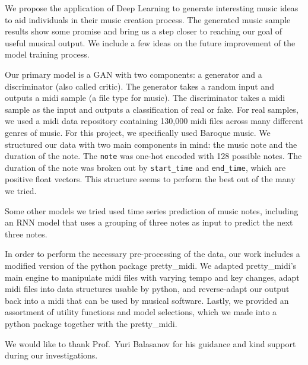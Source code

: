 \documentclass[12pt,oneside]{chicagocapstone}
\begin{document}
  \begin{executive}
    We propose the application of Deep Learning to generate interesting music ideas to aid individuals in their music creation process. The generated music sample results show some promise and bring us a step closer to reaching our goal of useful musical output. We include a few ideas on the future improvement of the model training process.
    
    Our primary model is a GAN with two components: a generator and a discriminator (also called critic). The generator takes a random input and outputs a midi sample (a file type for music). The discriminator takes a midi sample as the input and outputs a classification of real or fake. For real samples, we used a midi data repository containing 130,000 midi files across many different genres of music. For this project, we specifically used Baroque music. We structured our data with two main components in mind: the music note and the duration of the note. The \texttt{note} was one-hot encoded with 128 possible notes. The duration of the note was broken out by \texttt{start\_time} and \texttt{end\_time}, which are positive float vectors. This structure seems to perform the best out of the many we tried.
    
    Some other models we tried used time series prediction of music notes, including an RNN model that uses a grouping of three notes as input to predict the next three notes.
    
    In order to perform the necessary pre-processing of the data, our work includes a modified version of the python package pretty\_midi. We adapted pretty\_midi's main engine to manipulate midi files with varying tempo and key changes, adapt midi files into data structures usable by python, and reverse-adapt our output back into a midi that can be used by musical software. Lastly, we provided an assortment of utility functions and model selections, which we made into a python package together with the pretty\_midi.
    
    \bigskip
    \bigskip
    \bigskip
  \end{executive}

  \begin{acknowledgements}
    We would like to thank Prof.~Yuri Balasanov for his guidance and kind support during our investigations.
  \end{acknowledgements}

  \hypersetup{linkcolor=black}
  \setcounter{tocdepth}{2}
  \tableofcontents
\end{document}

